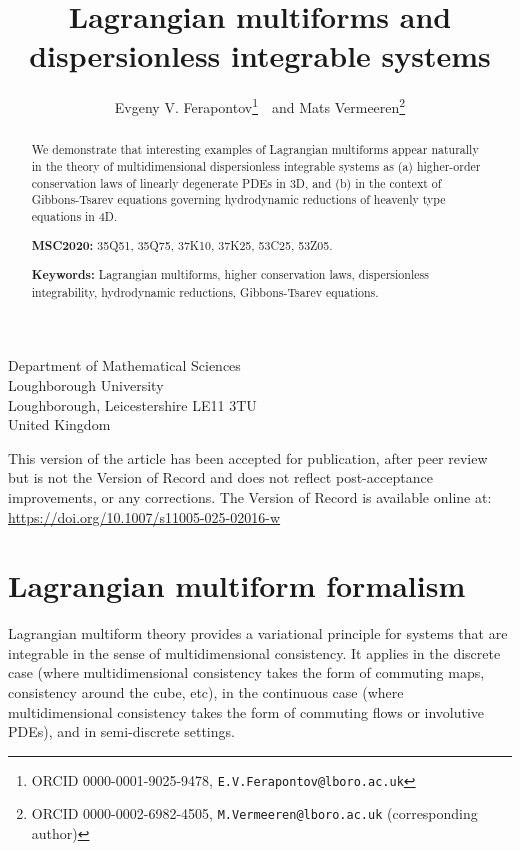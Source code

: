\documentclass[12pt, a4paper]{article}
\theoremstyle{definition}
\begin{document}
\title{Lagrangian multiforms and dispersionless integrable systems}
\author{Evgeny V. Ferapontov\footnote{ORCID 0000-0001-9025-9478, \texttt{E.V.Ferapontov@lboro.ac.uk}}\ \ and Mats Vermeeren\footnote{ORCID 0000-0002-6982-4505, \texttt{M.Vermeeren@lboro.ac.uk} (corresponding author)} }
   \date{}
   \maketitle
   \vspace{-7mm}
\begin{center}
Department of Mathematical Sciences \\ Loughborough University \\
Loughborough, Leicestershire LE11 3TU \\ United Kingdom
\end{center}

\bigskip

\begin{abstract}
\noindent
We demonstrate that interesting examples of Lagrangian multiforms appear naturally in the theory of multidimensional dispersionless  integrable systems as (a)  higher-order conservation laws of linearly degenerate PDEs in 3D, and (b) in the context of Gibbons-Tsarev equations governing hydrodynamic reductions of heavenly type equations in 4D.

\bigskip
\noindent
\textbf{MSC2020:}  35Q51, 35Q75, 37K10, 37K25,    53C25,   53Z05.       

\bigskip
\noindent
\textbf{Keywords:} Lagrangian multiforms,  higher conservation laws, dispersionless integrability, hydrodynamic reductions, Gibbons-Tsarev equations.
\end{abstract}

\vfill

{\footnotesize\noindent This version of the article has been accepted for publication, after peer review but is
	not the Version of Record and does not reflect post-acceptance improvements, or any corrections. The Version of Record is
	available online at: \url{https://doi.org/10.1007/s11005-025-02016-w}}


\pagebreak
\tableofcontents



\section{Lagrangian multiform formalism}
\label{sec:1}

Lagrangian multiform theory provides a variational principle for systems that are integrable in the sense of multidimensional consistency. It applies in the discrete case (where multidimensional consistency takes the form of commuting maps, consistency around the cube, etc), in the continuous case (where multidimensional consistency takes the form of commuting flows or involutive PDEs), and in semi-discrete settings.
\end{document}
